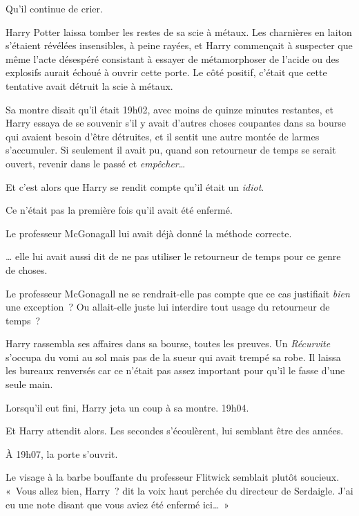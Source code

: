 Qu'il continue de crier.

\later

Harry Potter laissa tomber les restes de sa scie à métaux.
Les charnières en laiton s'étaient révélées insensibles, à peine rayées, et Harry commençait à suspecter que même l'acte désespéré consistant à essayer de métamorphoser de l'acide ou des explosifs aurait échoué à ouvrir cette porte.
Le côté positif, c'était que cette tentative avait détruit la scie à métaux.

Sa montre disait qu'il était 19h02, avec moins de quinze minutes restantes, et Harry essaya de se souvenir s'il y avait d'autres choses coupantes dans sa bourse qui avaient besoin d'être détruites, et il sentit une autre montée de larmes s'accumuler.
Si seulement il avait pu, quand son retourneur de temps se serait ouvert, revenir dans le passé et \emph{empêcher}…

Et c'est alors que Harry se rendit compte qu'il était un \emph{idiot}.

Ce n'était pas la première fois qu'il avait été enfermé.

Le professeur McGonagall lui avait déjà donné la méthode correcte.

… elle lui avait aussi dit de ne pas utiliser le retourneur de temps pour ce genre de choses.

Le professeur McGonagall ne se rendrait-elle pas compte que ce cas justifiait \emph{bien} une exception~?
Ou allait-elle juste lui interdire tout usage du retourneur de temps~?

Harry rassembla ses affaires dans sa bourse, toutes les preuves.
Un \emph{Récurvite} s'occupa du vomi au sol mais pas de la sueur qui avait trempé sa robe.
Il laissa les bureaux renversés car ce n'était pas assez important pour qu'il le fasse d'une seule main.

Lorsqu'il eut fini, Harry jeta un coup à sa montre.
19h04.

Et Harry attendit alors.
Les secondes s'écoulèrent, lui semblant être des années.

À 19h07, la porte s'ouvrit.

Le visage à la barbe bouffante du professeur Flitwick semblait plutôt soucieux.
«~Vous allez bien, Harry~? dit la voix haut perchée du directeur de Serdaigle.
J'ai eu une note disant que vous aviez été enfermé ici…~»
